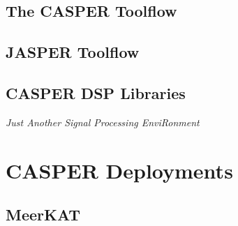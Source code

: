 \documentclass{ws-jai}
\begin{document}
\subsection{The CASPER Toolflow}


\subsection{JASPER Toolflow}


\subsection{CASPER DSP Libraries}


\emph{Just Another Signal Processing EnviRonment}


\section{CASPER Deployments} \label{sec:Deployments}

\subsection{MeerKAT}

\end{document}
